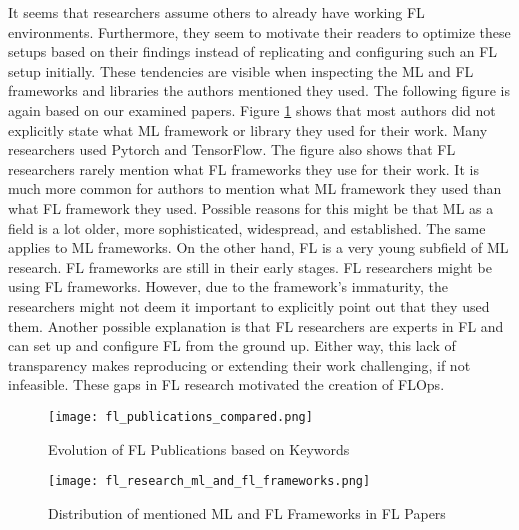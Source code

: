 It seems that researchers assume others to already have working FL environments.
Furthermore, they seem to motivate their readers to optimize these setups based on their findings instead of replicating and configuring such an FL setup initially.
These tendencies are visible when inspecting the ML and FL frameworks and libraries the authors mentioned they used.
The following figure is again based on our examined papers.
Figure \ref{fig:fl_research_ml_and_fl_frameworks} shows that most authors did not explicitly state what ML framework or library they used for their work.
Many researchers used Pytorch and TensorFlow.
The figure also shows that FL researchers rarely mention what FL frameworks they use for their work.
It is much more common for authors to mention what ML framework they used than what FL framework they used.
Possible reasons for this might be that ML as a field is a lot older, more sophisticated, widespread, and established.
The same applies to ML frameworks.
On the other hand, FL is a very young subfield of ML research.
FL frameworks are still in their early stages.
FL researchers might be using FL frameworks.
However, due to the framework's immaturity, the researchers might not deem it important to explicitly point out that they used them.
Another possible explanation is that FL researchers are experts in FL and can set up and configure FL from the ground up.
Either way, this lack of transparency makes reproducing or extending their work challenging, if not infeasible.
These gaps in FL research motivated the creation of FLOps.

\begin{figure}[p]
    \centering
    \texttt{[image: fl\_publications\_compared.png]}
    \caption{Evolution of FL Publications based on Keywords}
    \label{fig:fl_publications_compared}
    \vspace{2cm}
    \begin{adjustwidth}{-0.1\paperwidth}{-0.1\paperwidth}
        \centering
        \texttt{[image: fl\_research\_ml\_and\_fl\_frameworks.png]}
        \caption{Distribution of mentioned ML and FL Frameworks in FL Papers}
        \label{fig:fl_research_ml_and_fl_frameworks}
    \end{adjustwidth}
\end{figure}

\pagebreak